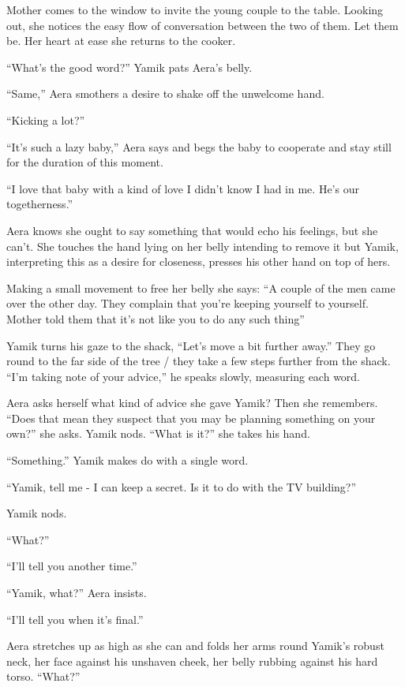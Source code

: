 \documentclass[twoside,11pt]{book}
\begin{document}
Mother comes to the window to invite the young couple to the table. Looking out, she notices the easy
flow of conversation between the two of them. Let them be. Her heart at ease she returns to the cooker.

``What's the good word?'' Yamik pats Aera's belly.

``Same,'' Aera smothers a desire to shake off the unwelcome hand.

``Kicking a lot?''

``It's such a lazy baby,'' Aera says and begs the baby to cooperate and stay still for the
duration of this moment.

``I love that baby with a kind of love I didn't know I had in me. He's our togetherness.''

Aera knows she ought to say something that would echo his feelings, but she can't. She touches the hand lying on her
belly intending to remove it but Yamik, interpreting this as a desire for closeness, presses his other hand on top of
hers.

Making a small movement to free her belly she says: ``A couple of the men came over the other day. They
complain that you're keeping yourself to yourself. Mother told them that it's not like you to do any such
thing''

Yamik turns his gaze to the shack, ``Let's move a bit further away.'' They go round to the far
side of the tree / they take a few steps further from the shack. ``I'm taking note of your
advice,'' he speaks slowly, measuring each word.

Aera asks herself what kind of advice she gave Yamik? Then she remembers. ``Does that mean they suspect
that you may be planning something on your own?'' she asks. Yamik nods. ``What is
it?'' she takes his hand.

``Something.'' Yamik makes do with a single word.

``Yamik, tell me - I can keep a secret. Is it to do with the TV building?''

Yamik nods.

``What?''

``I'll tell you another time.''

``Yamik, what?'' Aera insists.

``I'll tell you when it's final.''

Aera stretches up as high as she can and folds her arms round Yamik's robust neck, her face against his unshaven cheek,
her belly rubbing against his hard torso. ``What?''
\end{document}
